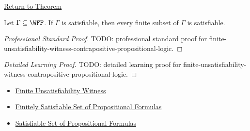 \newpage
{}
\label{prf:finite-unsatisfiability-witness-contrapositive-propositional-logic}

\begin{remark*}[Return]
\hyperref[cor:finite-unsatisfiability-witness-contrapositive-propositional-logic]{Return to Theorem}
\end{remark*}

\begin{theorem*}
Let \(\Gamma\subseteq\WFF\). If \(\Gamma\) is satisfiable, then every finite
subset of \(\Gamma\) is satisfiable.

\medskip
\end{theorem*}

\begin{proof}[Professional Standard Proof]
\LRAProofBodyStart
TODO: professional standard proof for finite-unsatisfiability-witness-contrapositive-propositional-logic.
\end{proof}

\begin{proof}[Detailed Learning Proof]
\LRAProofBodyStart
TODO: detailed learning proof for finite-unsatisfiability-witness-contrapositive-propositional-logic.
\end{proof}

\begin{remark*}
\end{remark*}

\begin{dependencies}
\begin{itemize}
  \item \hyperref[thm:finite-unsatisfiability-witness-propositional-logic]{Finite Unsatisfiability Witness}
  \item \hyperref[def:finitely-satisfiable-set-of-propositional-formulas]{Finitely Satisfiable Set of Propositional Formulas}
  \item \hyperref[def:satisfiable-set-of-propositional-formulas]{Satisfiable Set of Propositional Formulas}
\end{itemize}
\end{dependencies}

\clearpage
